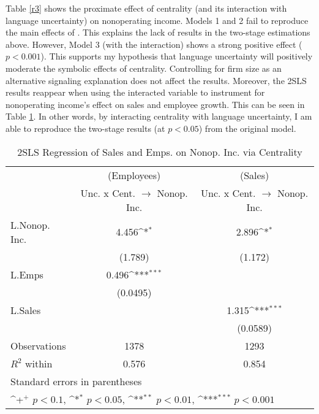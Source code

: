 Table \ref{r3} shows the proximate effect of centrality (and its interaction with language uncertainty) on nonoperating income. Models 1 and 2 fail to reproduce the main effects of \citet{powell1999}. This explains the lack of results in the two-stage estimations above. However, Model 3 (with the interaction) shows a strong positive effect ($p < 0.001$). This supports my hypothesis that language uncertainty will positively moderate the symbolic effects of centrality. Controlling for firm size as an alternative signaling explanation does not affect the results. Moreover, the 2SLS results reappear when using the interacted variable to instrument for nonoperating income's effect on sales and employee growth. This can be seen in Table \ref{r4}. In other words, by interacting centrality with language uncertainty, I am able to reproduce the two-stage results (at $p < 0.05$) from the original model.

\begin{table}[htbp]\centering \caption[Regression of Sales and Emps. on Nonop. Inc. via Centrality]{2SLS Regression of Sales and Emps. on Nonop. Inc. via Centrality\label{r4}}
{
\def\sym#1{\ifmmode^{#1}\else\(^{#1}\)\fi}
\begin{tabular}{l*{2}{c}}
\hline\hline
                    &\multicolumn{1}{c}{(Employees)}&\multicolumn{1}{c}{(Sales)}\\
                    &\multicolumn{1}{c}{Unc. x Cent. $\rightarrow$ Nonop. Inc.}&\multicolumn{1}{c}{Unc. x Cent. $\rightarrow$ Nonop. Inc.}\\
\hline
L.Nonop. Inc.     &       4.456\sym{*}  &       2.896\sym{*}  \\
                    &     (1.789)         &     (1.172)         \\
L.Emps         &       0.496\sym{***}&                     \\
                    &    (0.0495)         &                     \\
L.Sales             &                     &       1.315\sym{***}\\
                    &                     &    (0.0589)         \\
\hline
Observations        &        1378         &        1293         \\
$R^2$ within                &       0.576         &       0.854         \\
\hline\hline
\multicolumn{3}{l}{\footnotesize Standard errors in parentheses}\\
\multicolumn{3}{l}{\footnotesize \sym{+} \(p<0.1\), \sym{*} \(p<0.05\), \sym{**} \(p<0.01\), \sym{***} \(p<0.001\)}\\
\end{tabular}
}

\end{table}

